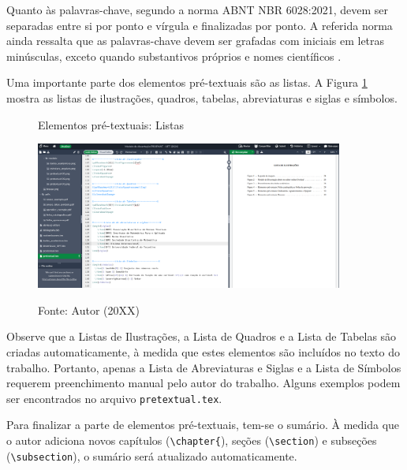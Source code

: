 \begin{apendicesenv}
Quanto às palavras-chave, segundo a norma ABNT NBR 6028:2021, devem ser separadas entre si por ponto e vírgula e finalizadas por ponto.  A referida norma ainda ressalta que as palavras-chave devem ser grafadas com iniciais em letras minúsculas, exceto quando substantivos próprios e nomes científicos \cite{nbr6028}.

Uma importante parte  dos elementos pré-textuais são as listas. A Figura \ref{fig:pretextual-04} mostra as listas de ilustrações, quadros, tabelas, abreviaturas e siglas e símbolos.

\begin{figure}[H]
    \centering
    \caption{Elementos pré-textuais: Listas}
    \includegraphics[width=0.9\textwidth]{img/modelo/pretextual-04.png}
    \\
    \caption*{\small{Fonte: Autor (20XX)}}
    \label{fig:pretextual-04}
\end{figure}

Observe que a Listas de Ilustrações, a Lista de Quadros e a Lista de Tabelas são criadas automaticamente, à medida que estes elementos são incluídos no texto do trabalho. Portanto, apenas a Lista de Abreviaturas e Siglas  e a Lista de Símbolos requerem preenchimento manual pelo autor do trabalho. Alguns exemplos podem ser encontrados no arquivo \verb|pretextual.tex|.

Para finalizar a parte de elementos pré-textuais, tem-se o sumário. À  medida que o autor adiciona novos capítulos (\verb|\chapter{|), seções (\verb|\section|) e subseções (\verb|\subsection|), o sumário será atualizado automaticamente.


\end{apendicesenv}

